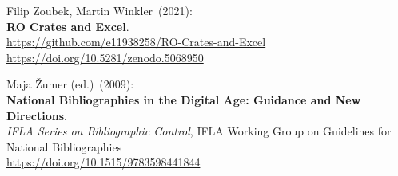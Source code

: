 \begin{thebibliography}{9}
Filip Zoubek, Martin Winkler~(2021): \\
\textbf{RO Crates and Excel}.\\
\url{https://github.com/e11938258/RO-Crates-and-Excel}\\
\url{https://doi.org/10.5281/zenodo.5068950}

Maja Žumer (ed.)~(2009): \\
\textbf{National Bibliographies in the Digital Age: Guidance and New Directions}.\\
\emph{IFLA Series on Bibliographic Control}, IFLA Working Group on
Guidelines for National Bibliographies\\
\url{https://doi.org/10.1515/9783598441844}


\end{thebibliography}

\makeatother

